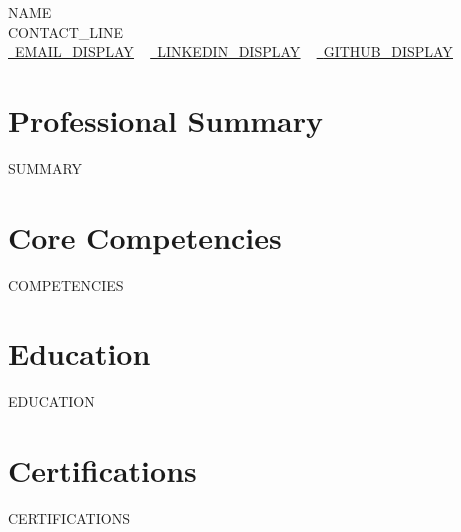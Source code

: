 \documentclass[letterpaper,11pt]{article}
\newcommand{\resumeSubHeadingListStart}{\begin{itemize}[leftmargin=0.0in, label={}]}
\newcommand{\resumeSubHeadingListEnd}{\end{itemize}}
\begin{document}
    \begin{center}
        {\Huge\scshape {{NAME}}}
        \\ {{CONTACT_LINE}}\\
        \small
        \href{{{EMAIL_URL}}}{\raisebox{-0.2\height}\faEnvelope\  \underline{{{EMAIL_DISPLAY}}}} ~
        \href{{{LINKEDIN_URL}}}{\raisebox{-0.2\height}\faLinkedin\ \underline{{{LINKEDIN_DISPLAY}}}}  ~
        \href{{{GITHUB_URL}}}{\raisebox{-0.2\height}\faGithub\ \underline{{{GITHUB_DISPLAY}}}}
    \end{center}

\section{Professional Summary}
\vspace{-5pt}
\small{{{SUMMARY}}}

\section{Core Competencies}
\vspace{-5pt}
\small{{{COMPETENCIES}}}

\section{Education}
  \resumeSubHeadingListStart
{{EDUCATION}}
  \resumeSubHeadingListEnd

\section{Certifications}
  \resumeSubHeadingListStart
{{CERTIFICATIONS}}
  \resumeSubHeadingListEnd

\end{document}
